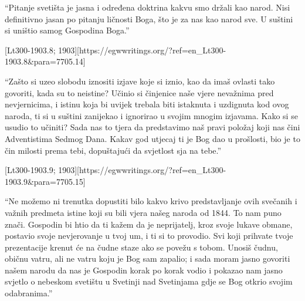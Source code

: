 “Pitanje svetišta je jasna i određena doktrina kakvu smo držali kao narod. Nisi definitivno jasan po pitanju ličnosti Boga, što je za nas kao narod sve. U suštini si uništio samog Gospodina Boga.”


[Lt300-1903.8; 1903][https://egwwritings.org/?ref=en\_Lt300-1903.8&para=7705.14]


“Zašto si uzeo slobodu iznositi izjave koje si iznio, kao da imaš ovlasti tako govoriti, kada su to neistine? Učinio si činjenice naše vjere nevažnima pred nevjernicima, i istinu koja bi uvijek trebala biti istaknuta i uzdignuta kod ovog naroda, ti si u suštini zanijekao i ignorirao u svojim mnogim izjavama. Kako si se usudio to učiniti? Sada nas to tjera da predstavimo naš pravi položaj koji nas čini Adventistima Sedmog Dana. Kakav god utjecaj ti je Bog dao u prošlosti, bio je to čin milosti prema tebi, dopuštajući da svjetlost sja na tebe.”


[Lt300-1903.9; 1903][https://egwwritings.org/?ref=en\_Lt300-1903.9&para=7705.15]


“Ne možemo ni trenutka dopustiti bilo kakvo krivo predstavljanje ovih svečanih i važnih predmeta istine koji su bili vjera našeg naroda od 1844. To nam puno znači. Gospodin bi htio da ti kažem da je neprijatelj, kroz svoje lukave obmane, postavio svoje nevjerovanje u tvoj um, i ti si to provodio. Svi koji prihvate tvoje prezentacije krenut će na čudne staze ako se povežu s tobom. Unosiš čudnu, običnu vatru, ali ne vatru koju je Bog sam zapalio; i sada moram jasno govoriti našem narodu da nas je Gospodin korak po korak vodio i pokazao nam jasno svjetlo o nebeskom svetištu u Svetinji nad Svetinjama gdje se Bog otkrio svojim odabranima.”


